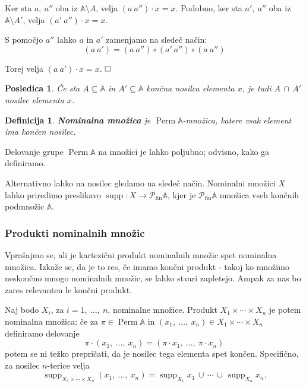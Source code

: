 \documentclass{article}
\DeclareMathOperator{\Perm}{Perm}
\DeclareMathOperator{\supp}{supp}
\def\qed{$\hfill\Box$}   %
\newtheorem{posledica}{Posledica}
\newtheorem{definicija}{Definicija}
\begin{document}
Ker sta \(a,\ a''\) oba iz \(\mathds{A} \setminus A\), velja \((a \ a'') \cdot x = x\). Podobno, ker sta \(a',\ a''\) oba iz \(\mathds{A} \setminus A'\), velja \((a' \ a'') \cdot x = x\).

S pomočjo \(a''\) lahko \(a\) in \(a'\) zamenjamo na sledeč način:
\[(a \ a') = (a \ a'') \circ (a' \ a'') \circ (a \ a'')\]

Torej velja \((a \ a') \cdot x = x\). \qed

\begin{posledica}
    Če sta \(A \subseteq \mathds{A}\) in \(A' \subseteq \mathds{A}\) končna nosilca elementa \(x\), je tudi \(A\, \cap\, A'\) nosilec elementa \(x\).
\end{posledica}

\begin{definicija}
    \textbf{Nominalna množica} je \(\Perm\mathds{A}\)-množica, katere vsak element ima končen nosilec.
\end{definicija}

Delovanje grupe \(\Perm\mathds{A}\) na množici je lahko poljubno; odvisno, kako ga definiramo.

Alternativno lahko na nosilec gledamo na sledeč način. 
Nominalni množici \(X\) lahko priredimo preslikavo \(\supp: X \rightarrow \mathcal{P}_{\text{fin}} \mathds{A}\), kjer je \(\mathcal{P}_{\text{fin}} \mathds{A}\) množica vseh končnih podmnožic \(\mathds{A}\).

\subsubsection{Produkti nominalnih množic}

Vprašajmo se, ali je kartezični produkt nominalnih množic spet nominalna množica. Izkaže se, da je to res, če imamo končni produkt - takoj ko množimo neskončno mnogo nominalnih množic, se lahko stvari zapletejo. Ampak za nas bo zares relevanten le končni produkt.

Naj bodo \(X_i\), za \(i = 1,\ \ldots,\ n\), nominalne množice. Produkt \(X_1 \times \cdots \times X_n\) je potem nominalna množica: če za \(\pi \in \Perm\mathds{A}\) in \((x_1,\ \ldots,\ x_n) \in X_1 \times \cdots \times X_n\) definiramo delovanje 
    \[
        \pi \cdot (x_1,\ \ldots,\ x_n) = (\pi \cdot x_1,\ \ldots,\ \pi \cdot x_n)
    \]
potem se ni težko prepričati, da je nosilec tega elementa spet končen. Specifično, za nosilec \(n\)-terice velja
\[
\supp_{X_1 \times \cdots \times X_n}(x_1,\ \ldots,\ x_n) = \supp_{X_1} x_1\, \cup\, \cdots\, \cup\, \supp_{X_n} x_n.
\]
\end{document}
